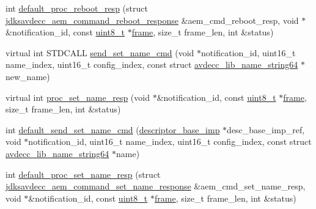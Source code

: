 \begin{DoxyCompactItemize}
\item 
int \hyperlink{classavdecc__lib_1_1descriptor__base__imp_a774dc940e9918a60127b0b021582b32a}{default\+\_\+proc\+\_\+reboot\+\_\+resp} (struct \hyperlink{structjdksavdecc__aem__command__reboot__response}{jdksavdecc\+\_\+aem\+\_\+command\+\_\+reboot\+\_\+response} \&aem\+\_\+cmd\+\_\+reboot\+\_\+resp, void $\ast$\&notification\+\_\+id, const \hyperlink{stdint_8h_aba7bc1797add20fe3efdf37ced1182c5}{uint8\+\_\+t} $\ast$\hyperlink{gst__avb__playbin_8c_ac8e710e0b5e994c0545d75d69868c6f0}{frame}, size\+\_\+t frame\+\_\+len, int \&status)
\item 
virtual int S\+T\+D\+C\+A\+LL \hyperlink{classavdecc__lib_1_1descriptor__base__imp_af0bb05af3bf67f2ab0eb522096011592}{send\+\_\+set\+\_\+name\+\_\+cmd} (void $\ast$notification\+\_\+id, uint16\+\_\+t name\+\_\+index, uint16\+\_\+t config\+\_\+index, const struct \hyperlink{structavdecc__lib_1_1avdecc__lib__name__string64}{avdecc\+\_\+lib\+\_\+name\+\_\+string64} $\ast$new\+\_\+name)
\item 
virtual int \hyperlink{classavdecc__lib_1_1descriptor__base__imp_a182c43d9f31980bb74f05956b1323624}{proc\+\_\+set\+\_\+name\+\_\+resp} (void $\ast$\&notification\+\_\+id, const \hyperlink{stdint_8h_aba7bc1797add20fe3efdf37ced1182c5}{uint8\+\_\+t} $\ast$\hyperlink{gst__avb__playbin_8c_ac8e710e0b5e994c0545d75d69868c6f0}{frame}, size\+\_\+t frame\+\_\+len, int \&status)
\item 
int \hyperlink{classavdecc__lib_1_1descriptor__base__imp_aed899a0eaaaa06a02569135f844ffce8}{default\+\_\+send\+\_\+set\+\_\+name\+\_\+cmd} (\hyperlink{classavdecc__lib_1_1descriptor__base__imp}{descriptor\+\_\+base\+\_\+imp} $\ast$desc\+\_\+base\+\_\+imp\+\_\+ref, void $\ast$notification\+\_\+id, uint16\+\_\+t name\+\_\+index, uint16\+\_\+t config\+\_\+index, const struct \hyperlink{structavdecc__lib_1_1avdecc__lib__name__string64}{avdecc\+\_\+lib\+\_\+name\+\_\+string64} $\ast$name)
\item 
int \hyperlink{classavdecc__lib_1_1descriptor__base__imp_a2f52c3b9a7ad6f490bed0c96a9136bc3}{default\+\_\+proc\+\_\+set\+\_\+name\+\_\+resp} (struct \hyperlink{structjdksavdecc__aem__command__set__name__response}{jdksavdecc\+\_\+aem\+\_\+command\+\_\+set\+\_\+name\+\_\+response} \&aem\+\_\+cmd\+\_\+set\+\_\+name\+\_\+resp, void $\ast$\&notification\+\_\+id, const \hyperlink{stdint_8h_aba7bc1797add20fe3efdf37ced1182c5}{uint8\+\_\+t} $\ast$\hyperlink{gst__avb__playbin_8c_ac8e710e0b5e994c0545d75d69868c6f0}{frame}, size\+\_\+t frame\+\_\+len, int \&status)
\item 

\end{DoxyCompactItemize}
